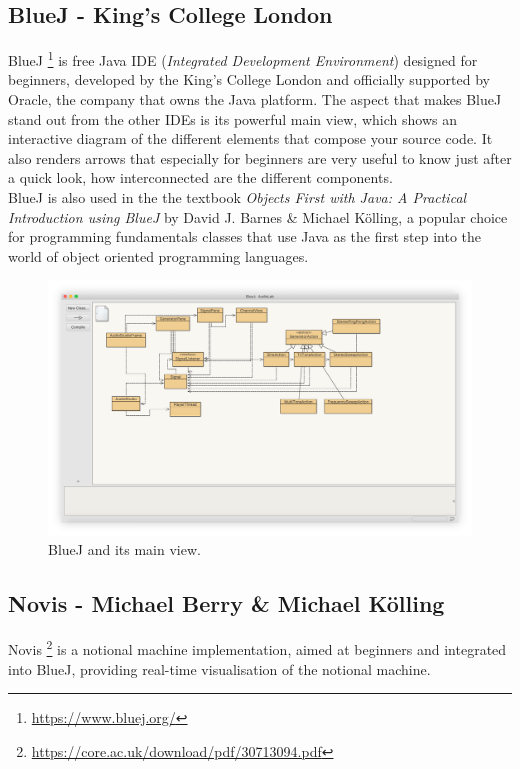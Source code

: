 \documentclass[]{usiinfbachelorproject}
\begin{document}
\subsection{BlueJ - King's College London}

BlueJ \footnote{\url{https://www.bluej.org/}} is free Java IDE (\emph{Integrated Development Environment}) designed for beginners, developed by the King's College London and officially supported by Oracle, the company that owns the Java platform.
The aspect that makes BlueJ stand out from the other IDEs is its powerful main view, which shows an interactive diagram of the different elements that compose your source code. It also renders arrows that especially for beginners are very useful to know just after a quick look, how interconnected are the different components.\\
BlueJ is also used in the the textbook \emph{Objects First with Java: A Practical Introduction using BlueJ} by David J. Barnes \& Michael K\"{o}lling, a popular choice for programming fundamentals classes that use Java as the first step into the world of object oriented programming languages.

\begin{figure}[h]
\centering
\includegraphics[width=\textwidth]{figures/bluej_shadow.png}
\caption {BlueJ and its main view.}
\end{figure}

\subsection{Novis - Michael Berry \& Michael K\"{o}lling}

Novis \footnote{\url{https://core.ac.uk/download/pdf/30713094.pdf}} is a notional machine implementation, aimed at beginners and integrated into BlueJ, providing real-time visualisation of the notional machine.
\end{document}
